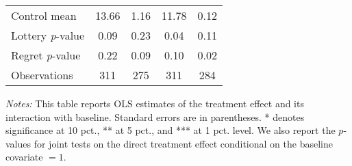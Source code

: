 \begin{table}[htbp]
{\begin{threeparttable}
\begin{tabular}{l*{4}{c}}
Control mean    &    13.66         &     1.16         &    11.78         &     0.12         \\
Lottery \emph{p}-value&     0.09         &     0.23         &     0.04         &     0.11         \\
Regret \emph{p}-value&     0.22         &     0.09         &     0.10         &     0.02         \\
Observations    &      311         &      275         &      311         &      284         \\
\bottomrule \end{tabular} \begin{tablenotes}[flushleft] \footnotesize \item \emph{Notes:} This table reports OLS estimates of the treatment effect and its interaction with baseline. Standard errors are in parentheses. * denotes significance at 10 pct., ** at 5 pct., and *** at 1 pct. level. We also report the \(p\)-values for joint tests on the direct treatment effect conditional on the baseline covariate $= 1$. \end{tablenotes} \end{threeparttable} } \end{table}

